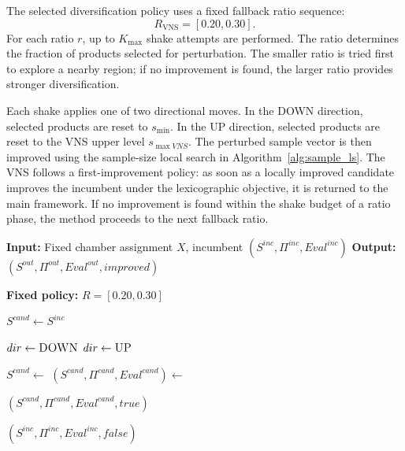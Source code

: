 \documentclass[11pt]{article}
\begin{document}
The selected diversification policy uses a fixed fallback ratio sequence:
\[
R_{\mathrm{VNS}}=[0.20,0.30].
\]
For each ratio \(r\), up to \(K_{\max}\) shake attempts are performed. The ratio determines the fraction of products selected for perturbation. The smaller ratio is tried first to explore a nearby region; if no improvement is found, the larger ratio provides stronger diversification.

Each shake applies one of two directional moves. In the \textsc{DOWN} direction, selected products are reset to \(s_{\min}\). In the \textsc{UP} direction, selected products are reset to the VNS upper level \(s_{\max VNS}\). The perturbed sample vector is then improved using the sample-size local search in Algorithm~\ref{alg:sample_ls}. The VNS follows a first-improvement policy: as soon as a locally improved candidate improves the incumbent under the lexicographic objective, it is returned to the main framework. If no improvement is found within the shake budget of a ratio phase, the method proceeds to the next fallback ratio.

\begin{algorithm}[H]
\caption{VNS with Fixed Fallback Ratios}
\label{alg:vns_fixed_fallback}
\begin{algorithmic}[1]
\State \textbf{Input:} Fixed chamber assignment $X$, incumbent $(S^{inc}, \Pi^{inc}, Eval^{inc})$
\State \textbf{Output:} $(S^{out}, \Pi^{out}, Eval^{out}, improved)$

\State \textbf{Fixed policy:} $R = [0.20, 0.30]$


        \State $S^{cand} \gets S^{inc}$

            \State $dir \gets \textsc{DOWN}$
        \Else
            \State $dir \gets \textsc{UP}$
        \EndIf

        \State $S^{cand} \gets$ 
        \State $(S^{cand}, \Pi^{cand}, Eval^{cand}) \gets$

            \State \Return $(S^{cand}, \Pi^{cand}, Eval^{cand}, true)$
        \EndIf

    \EndFor
\EndFor

\State \Return $(S^{inc}, \Pi^{inc}, Eval^{inc}, false)$
\end{algorithmic}
\end{algorithm}
\end{document}
